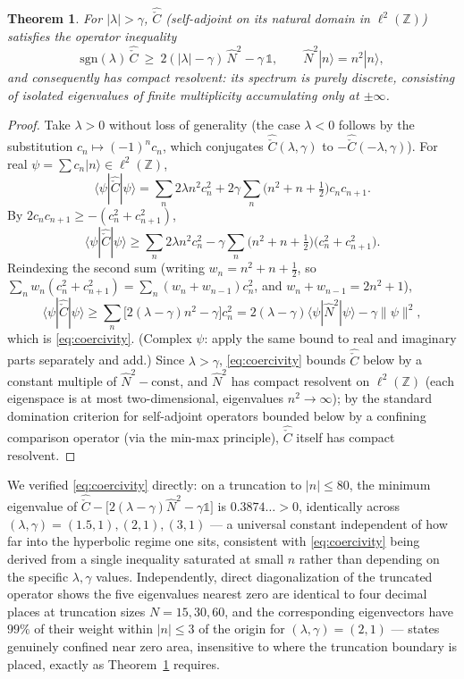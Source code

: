 \documentclass[11pt]{amsart}
\newtheorem{theorem}{Theorem}[section]
\theoremstyle{remark}
\begin{document}
\begin{theorem}\label{thm:discrete}
For $|\lambda|>\gamma$, $\hat{\check C}$ (self-adjoint on its natural domain in $\ell^2(\mathbb Z)$) satisfies the operator inequality
\begin{equation}\label{eq:coercivity}
\mathrm{sgn}(\lambda)\,\hat{\check C} \ \geq\ 2(|\lambda|-\gamma)\,\hat N^2 - \gamma\,\mathbb 1,\qquad \hat N^2|n\rangle=n^2|n\rangle,
\end{equation}
and consequently has compact resolvent: its spectrum is purely discrete, consisting of isolated eigenvalues of finite multiplicity accumulating only at $\pm\infty$.
\end{theorem}
\begin{proof}
Take $\lambda>0$ without loss of generality (the case $\lambda<0$ follows by the substitution $c_n\mapsto(-1)^nc_n$, which conjugates $\hat{\check C}(\lambda,\gamma)$ to $-\hat{\check C}(-\lambda,\gamma)$). For real $\psi=\sum c_n|n\rangle\in\ell^2(\mathbb Z)$,
\[
\langle\psi|\hat{\check C}|\psi\rangle = \sum_n2\lambda n^2c_n^2 + 2\gamma\sum_n\Big(n^2+n+\tfrac12\Big)c_nc_{n+1}.
\]
By $2c_nc_{n+1}\geq-(c_n^2+c_{n+1}^2)$,
\[
\langle\psi|\hat{\check C}|\psi\rangle \geq \sum_n2\lambda n^2c_n^2 -\gamma\sum_n\Big(n^2+n+\tfrac12\Big)\big(c_n^2+c_{n+1}^2\big).
\]
Reindexing the second sum (writing $w_n=n^2+n+\tfrac12$, so $\sum_nw_n(c_n^2+c_{n+1}^2)=\sum_n(w_n+w_{n-1})c_n^2$, and $w_n+w_{n-1}=2n^2+1$),
\[
\langle\psi|\hat{\check C}|\psi\rangle \geq \sum_n\Big[2(\lambda-\gamma)n^2-\gamma\Big]c_n^2 = 2(\lambda-\gamma)\langle\psi|\hat N^2|\psi\rangle-\gamma\|\psi\|^2,
\]
which is \eqref{eq:coercivity}. (Complex $\psi$: apply the same bound to real and imaginary parts separately and add.) Since $\lambda>\gamma$, \eqref{eq:coercivity} bounds $\hat{\check C}$ below by a constant multiple of $\hat N^2-\text{const}$, and $\hat N^2$ has compact resolvent on $\ell^2(\mathbb Z)$ (each eigenspace is at most two-dimensional, eigenvalues $n^2\to\infty$); by the standard domination criterion for self-adjoint operators bounded below by a confining comparison operator (via the min-max principle), $\hat{\check C}$ itself has compact resolvent.
\end{proof}

We verified \eqref{eq:coercivity} directly: on a truncation to $|n|\leq80$, the minimum eigenvalue of $\hat{\check C}-\big[2(\lambda-\gamma)\hat N^2-\gamma\mathbb 1\big]$ is $0.3874\ldots>0$, identically across $(\lambda,\gamma)=(1.5,1),(2,1),(3,1)$ --- a universal constant independent of how far into the hyperbolic regime one sits, consistent with \eqref{eq:coercivity} being derived from a single inequality saturated at small $n$ rather than depending on the specific $\lambda,\gamma$ values. Independently, direct diagonalization of the truncated operator shows the five eigenvalues nearest zero are identical to four decimal places at truncation sizes $N=15,30,60$, and the corresponding eigenvectors have $99\%$ of their weight within $|n|\leq3$ of the origin for $(\lambda,\gamma)=(2,1)$ --- states genuinely confined near zero area, insensitive to where the truncation boundary is placed, exactly as Theorem~\ref{thm:discrete} requires.
\end{document}
